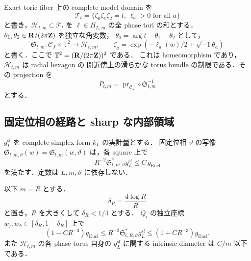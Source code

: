 Exact toric fiber 上の complete model domain を
\[
 \mathscr T_t=\{\zeta_0\zeta_1\zeta_2=t,\ \ell_a>0\text{ for all }a\}
\]
と書き，$\mathscr H_{t,m}\subset\mathscr T_t$ を
$\ell\in H_{L,m}$ の全 phase tori の和とする．
$\theta_1,\theta_2\in\mathbf R/(2\pi\mathbf Z)$ を独立な角変数，
$\theta_0=\arg t-\theta_1-\theta_2$ として，
\begin{equation}\label{simplex:eq:closed-corner-torus-parameter}
 \mathfrak S_{t,m}:\mathcal C_J\times\mathbb T^2\longrightarrow\mathscr H_{t,m},
 \qquad
 \zeta_a=\exp(-\ell_a(w)/2+\sqrt{-1}\theta_a)
\end{equation}
と書く．ここで $\mathbb T^2=(\mathbf R/(2\pi\mathbf Z))^2$ である．
これは homeomorphism であり，$\mathscr H_{t,m}$ は radial hexagon の
開近傍上の滑らかな torus bundle の制限である．その projection を
\[
 P_{t,m}=\operatorname{pr}_{\mathcal C_J}\circ\mathfrak S_{t,m}^{-1}
\]
とする．

\subsection{固定位相の経路と sharp な内部領域}

\begin{lemma}
\label{simplex:lem:softmax-path-metric}
$g_L^{\mathrm{sf}}$ を complete simplex form $k_L$ の実計量とする．
固定位相 $\vartheta$ の写像 $\mathfrak S_{t,m,\vartheta}(w)=
\mathfrak S_{t,m}(w,\vartheta)$ は，各 square 上で
\begin{equation}\label{simplex:eq:softmax-coarse-lipschitz}
 R^{-2}\mathfrak S_{t,m,\vartheta}^*g_L^{\mathrm{sf}}
 \le C\,g_{\mathrm{Eucl}}
\end{equation}
を満たす．定数は $L,m,\vartheta$ に依存しない．

以下 $m=R$ とする．
\begin{equation}\label{simplex:eq:protected-square-width}
 \delta_R=\frac{4\log R}{R}
\end{equation}
と置き，$R$ を大きくして $\delta_R<1/4$ とする．
$Q_i$ の独立座標 $w_j,w_k\in[\delta_R,1-\delta_R]$ 上で
\begin{equation}\label{simplex:eq:softmax-sharp-interior}
 (1-CR^{-3})g_{\mathrm{Eucl}}
 \le R^{-2}\mathfrak S_{t,R,\vartheta}^*g_L^{\mathrm{sf}}
 \le(1+CR^{-3})g_{\mathrm{Eucl}}.
\end{equation}
また $\mathscr H_{t,m}$ の各 phase torus 自身の
$g_L^{\mathrm{sf}}$ に関する intrinsic diameter は $C/m$ 以下である．
\end{lemma}

